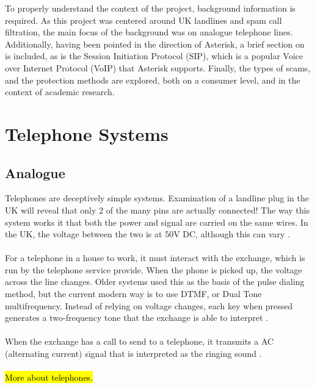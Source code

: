 \documentclass[main.tex]{subfiles}
\begin{document}
To properly understand the context of the project, background information is required. As this project was centered around UK landlines and spam call filtration, the main focus of the background was on analogue telephone lines. Additionally, having been pointed in the direction of Asterisk, a brief section on is included, as is the Session Initiation Protocol (SIP), which is a popular Voice over Internet Protocol (VoIP) that Asterisk supports. Finally, the types of scams, and the protection methods are explored, both on a consumer level, and in the context of academic research.


\section{Telephone Systems}
\subsection{Analogue}
Telephones are deceptively simple systems. Examination of a landline plug in the UK will reveal that only 2 of the many pins are actually connected! The way this system works it that both the power and signal are carried on the same wires. In the UK, the voltage between the two is at 50V DC, although this can vary \cite{telephone}.
\\\\
For a telephone in a house to work, it must interact with the exchange, which is run by the telephone service provide. When the phone is picked up, the voltage across the line changes. Older systems used this as the basis of the pulse dialing method, but the current modern way is to use DTMF, or Dual Tone multifrequency. Instead of relying on voltage changes, each key when pressed generates a two-frequency tone that the exchange is able to interpret \cite{telephone}.
\\\\
When the exchange has a call to send to a telephone, it transmits a AC (alternating current) signal that is interpreted as the ringing sound \cite{telephone}.
\\\\
\hl{More about telephones.}
\end{document}
